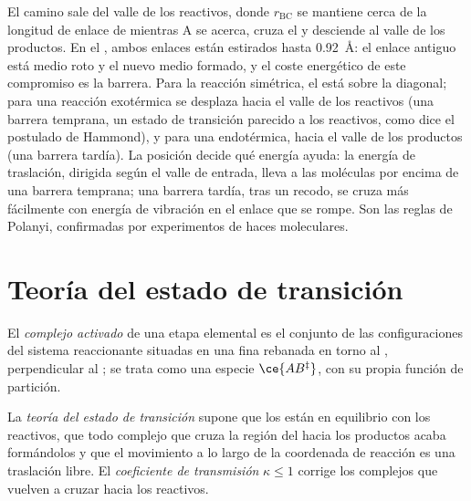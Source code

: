 El camino sale del valle de los reactivos, donde $r_{\mathrm{BC}}$ se mantiene cerca de la longitud de enlace
de  mientras A se acerca, cruza el  y desciende al valle de
los productos. En el , ambos enlaces están estirados hasta \qty{0.92}{\angstrom}: el enlace
antiguo está medio roto y el nuevo medio formado, y el coste energético de este
compromiso es la barrera. Para la reacción simétrica, el  está sobre la
diagonal; para una reacción exotérmica se desplaza hacia el valle de los reactivos (una
barrera temprana, un estado de transición parecido a los reactivos, como dice el postulado de
Hammond), y para una endotérmica, hacia el valle de los productos (una barrera tardía).
La posición decide qué energía ayuda: la energía de traslación, dirigida según
el valle de entrada, lleva a las moléculas por encima de una barrera temprana; una barrera
tardía, tras un recodo, se cruza más fácilmente con energía de vibración en el
enlace que se rompe. Son las reglas de Polanyi, confirmadas por experimentos de
haces moleculares.

\section{Teoría del estado de transición}

\begin{definition}\label{def:b3:rate-theories:activated-complex}
El \emph{complejo activado} de una etapa elemental es el
conjunto de las configuraciones del sistema reaccionante situadas en una fina rebanada en torno al
, perpendicular al ; se trata como una
especie $\ce{AB^{\ddagger}}$, con su propia función de partición.
\end{definition}

\begin{definition}\label{def:b3:rate-theories:tst}
La \emph{teoría del estado de transición} supone que los
 están en equilibrio con los reactivos, que todo complejo
que cruza la región del  hacia los productos acaba formándolos y que
el movimiento a lo largo de la coordenada de reacción es una traslación libre. El
\emph{coeficiente de transmisión} $\kappa \le 1$ corrige
los complejos que vuelven a cruzar hacia los reactivos.
\end{definition}

